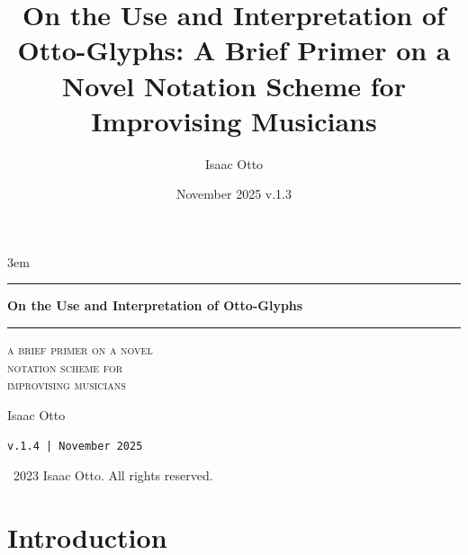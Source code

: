 \documentclass[twoside, 11pt]{book}
\title{On the Use and Interpretation of Otto-Glyphs: A Brief Primer on a Novel Notation Scheme for Improvising Musicians}
\author{Isaac Otto}
\date{November 2025 v.1.3}
\begin{document}
\pagestyle{fancy}
\renewcommand{\chaptermark}[1]{%
\markboth{#1}{}}

\fancyhf{} %
\fancyhead[OHR]{\thepage}
\fancyhead[EHL]{\thepage}

\emergencystretch 3em

\begin{titlepage}
    \centering
    \rule{\textwidth}{1pt}\par
    {\fontsize{32}{36}\bfseries On the Use and Interpretation of Otto-Glyphs\par}
    \rule{\textwidth}{1pt}\par
    \vspace{.3in}
    {\LARGE\scshape a brief primer on a novel\\notation scheme for\\improvising musicians\par}
    \vspace{.75in}
    {\huge Isaac Otto\par}
    \vfill
    {\LARGE \texttt{v.1.4 | November 2025}\par}
\end{titlepage}

\newpage
\thispagestyle{empty}
\vspace*{\fill}
\begin{center}
    \textcopyright~2023 Isaac Otto. All rights reserved.
\end{center}    
\vspace*{\fill}
\newpage


\tableofcontents
\setlength{\marginparwidth}{50pt}

\newpage
{}

\chapter{Introduction}
\label{ch:intro}

\end{document}
